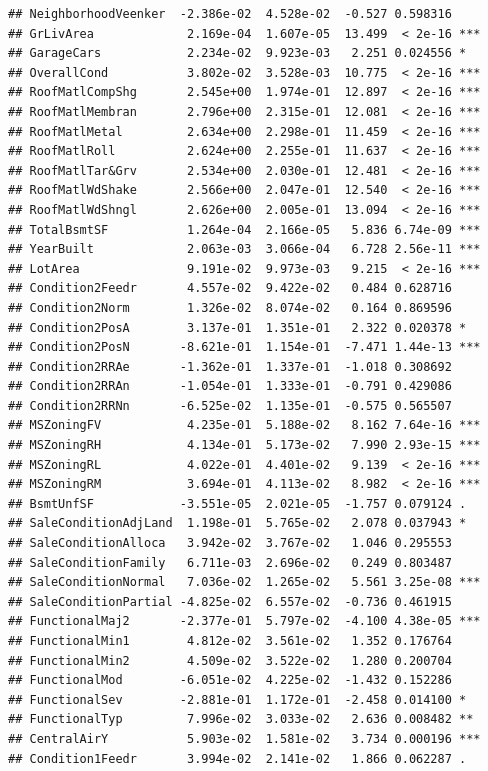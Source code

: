 \documentclass[american,]{article}
\theoremstyle{definition}
\theoremstyle{definition}
\theoremstyle{definition}
\theoremstyle{remark}
\begin{document}
\begin{verbatim}
## NeighborhoodVeenker  -2.386e-02  4.528e-02  -0.527 0.598316    
## GrLivArea             2.169e-04  1.607e-05  13.499  < 2e-16 ***
## GarageCars            2.234e-02  9.923e-03   2.251 0.024556 *  
## OverallCond           3.802e-02  3.528e-03  10.775  < 2e-16 ***
## RoofMatlCompShg       2.545e+00  1.974e-01  12.897  < 2e-16 ***
## RoofMatlMembran       2.796e+00  2.315e-01  12.081  < 2e-16 ***
## RoofMatlMetal         2.634e+00  2.298e-01  11.459  < 2e-16 ***
## RoofMatlRoll          2.624e+00  2.255e-01  11.637  < 2e-16 ***
## RoofMatlTar&Grv       2.534e+00  2.030e-01  12.481  < 2e-16 ***
## RoofMatlWdShake       2.566e+00  2.047e-01  12.540  < 2e-16 ***
## RoofMatlWdShngl       2.626e+00  2.005e-01  13.094  < 2e-16 ***
## TotalBsmtSF           1.264e-04  2.166e-05   5.836 6.74e-09 ***
## YearBuilt             2.063e-03  3.066e-04   6.728 2.56e-11 ***
## LotArea               9.191e-02  9.973e-03   9.215  < 2e-16 ***
## Condition2Feedr       4.557e-02  9.422e-02   0.484 0.628716    
## Condition2Norm        1.326e-02  8.074e-02   0.164 0.869596    
## Condition2PosA        3.137e-01  1.351e-01   2.322 0.020378 *  
## Condition2PosN       -8.621e-01  1.154e-01  -7.471 1.44e-13 ***
## Condition2RRAe       -1.362e-01  1.337e-01  -1.018 0.308692    
## Condition2RRAn       -1.054e-01  1.333e-01  -0.791 0.429086    
## Condition2RRNn       -6.525e-02  1.135e-01  -0.575 0.565507    
## MSZoningFV            4.235e-01  5.188e-02   8.162 7.64e-16 ***
## MSZoningRH            4.134e-01  5.173e-02   7.990 2.93e-15 ***
## MSZoningRL            4.022e-01  4.401e-02   9.139  < 2e-16 ***
## MSZoningRM            3.694e-01  4.113e-02   8.982  < 2e-16 ***
## BsmtUnfSF            -3.551e-05  2.021e-05  -1.757 0.079124 .  
## SaleConditionAdjLand  1.198e-01  5.765e-02   2.078 0.037943 *  
## SaleConditionAlloca   3.942e-02  3.767e-02   1.046 0.295553    
## SaleConditionFamily   6.711e-03  2.696e-02   0.249 0.803487    
## SaleConditionNormal   7.036e-02  1.265e-02   5.561 3.25e-08 ***
## SaleConditionPartial -4.825e-02  6.557e-02  -0.736 0.461915    
## FunctionalMaj2       -2.377e-01  5.797e-02  -4.100 4.38e-05 ***
## FunctionalMin1        4.812e-02  3.561e-02   1.352 0.176764    
## FunctionalMin2        4.509e-02  3.522e-02   1.280 0.200704    
## FunctionalMod        -6.051e-02  4.225e-02  -1.432 0.152286    
## FunctionalSev        -2.881e-01  1.172e-01  -2.458 0.014100 *  
## FunctionalTyp         7.996e-02  3.033e-02   2.636 0.008482 ** 
## CentralAirY           5.903e-02  1.581e-02   3.734 0.000196 ***
## Condition1Feedr       3.994e-02  2.141e-02   1.866 0.062287 .  

\end{verbatim}
\end{document}

